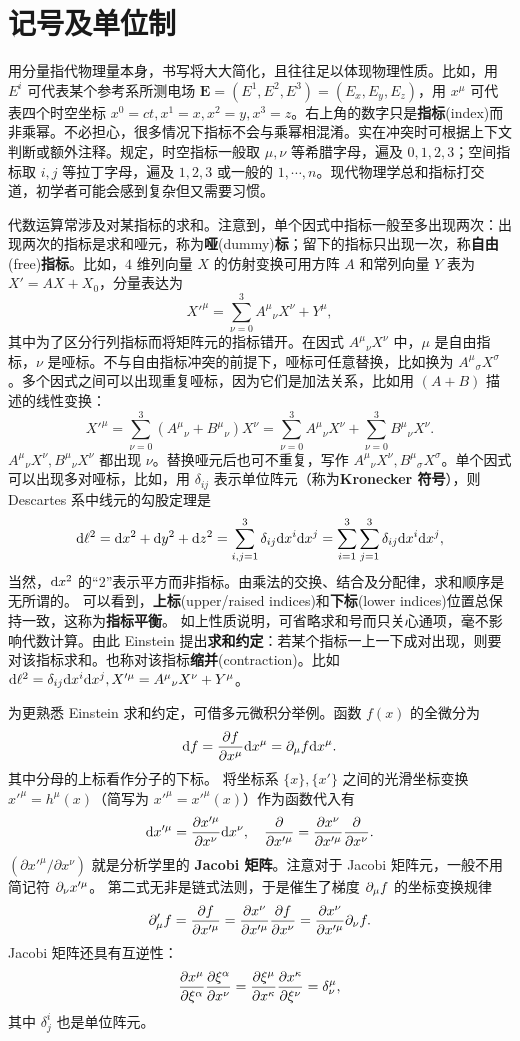 \chapter*{记号及单位制}



用分量指代物理量本身，书写将大大简化，且往往足以体现物理性质。比如，用 $E^i$ 可代表某个参考系所测电场 $\bm E=(E^1,E^2,E^3)=(E_x,E_y,E_z)$，用 $x^\mu$ 可代表四个时空坐标 $x^0=ct,x^1=x,x^2=y,x^3=z$。右上角的数字只是\textbf{指标}(index)而非乘幂。不必担心，很多情况下指标不会与乘幂相混淆。实在冲突时可根据上下文判断或额外注释。规定，时空指标一般取 $\mu,\nu$ 等希腊字母，遍及 $0,1,2,3$；空间指标取 $i,j$ 等拉丁字母，遍及 $1,2,3$ 或一般的 $1,\cdots,n$。现代物理学总和指标打交道，初学者可能会感到复杂但又需要习惯。

代数运算常涉及对某指标的求和。注意到，单个因式中指标一般至多出现两次：出现两次的指标是求和哑元，称为\textbf{哑}(dummy)\textbf{标}；留下的指标只出现一次，称\textbf{自由}(free)\textbf{指标}。比如，$4$ 维列向量 $X$ 的仿射变换可用方阵 $A$ 和常列向量 $Y$ 表为 $X'=AX+X_0$，分量表达为
\[X'^\mu=\sum_{\nu=0}^3 A^{\mu}{}_{\nu}X^\nu+ Y^\mu,\]
其中为了区分行列指标而将矩阵元的指标错开。在因式 $A^{\mu}{}_{\nu}X^\nu$ 中，$\mu$ 是自由指标，$\nu$ 是哑标。不与自由指标冲突的前提下，哑标可任意替换，比如换为 $A^{\mu}{}_{\sigma}X^\sigma$。多个因式之间可以出现重复哑标，因为它们是加法关系，比如用 $(A+B)$ 描述的线性变换：
\[X'^\mu=\sum_{\nu=0}^3 (A^{\mu}{}_{\nu}+B^{\mu}{}_{\nu})X^\nu=\sum_{\nu=0}^3 A^{\mu}{}_{\nu}X^\nu+\sum_{\nu=0}^3 B^{\mu}{}_{\nu}X^\nu.\]
$A^{\mu}{}_{\nu}X^\nu,B^{\mu}{}_{\nu}X^\nu$ 都出现 $\nu$。替换哑元后也可不重复，写作 $A^{\mu}{}_{\nu}X^\nu,B^{\mu}{}_{\sigma}X^\sigma$。单个因式可以出现多对哑标，比如，用 $\delta_{ij}$ 表示单位阵元（称为\textbf{Kronecker 符号}），则 Descartes 系中线元的勾股定理是
\[\dd\ell^2=\dd x^2+\dd y^2+\dd z^2=\sum_{i,j=1}^3\delta_{ij}\dd x^i\dd x^j=\sum_{i=1}^3\sum_{j=1}^3\delta_{ij}\dd x^i\dd x^j,\]
当然，$\dd x^2$ 的“2”表示平方而非指标。由乘法的交换、结合及分配律，求和顺序是无所谓的。
可以看到，\textbf{上标}(upper/raised indices)和\textbf{下标}(lower indices)位置总保持一致，这称为\textbf{指标平衡}。
如上性质说明，可省略求和号而只关心通项，毫不影响代数计算。由此 Einstein 提出\textbf{求和约定}：若某个指标一上一下成对出现，则要对该指标求和。也称对该指标\textbf{缩并}(contraction)。比如 $\dd\ell^2=\delta_{ij}\dd x^i\dd x^j,X'^\mu=A^{\mu}{}_{\nu}X^\nu+ Y^\mu$。

为更熟悉 Einstein 求和约定，可借多元微积分举例。函数 $f(x)$ 的全微分为
\[
    \dd f=\pdv{f}{x^\mu}\dd x^\mu=\partial_\mu f\dd x^\mu.
\]
其中分母的上标看作分子的下标。
将坐标系 $\{x\},\{x'\}$ 之间的光滑坐标变换 $x'^\mu=h^\mu(x)$（简写为 $x'^\mu=x'^\mu(x)$）作为函数代入有
\[
    \dd x'^\mu=\pdv{x'^\mu}{x^\nu}\dd x^\nu,\quad \pdv{x'^\mu} =\pdv{x^\nu}{x'^\mu} \pdv{x^\nu}. 
\]
$({\partial x'^\mu}/{\partial x^\nu})$ 就是分析学里的 \textbf{Jacobi 矩阵}。注意对于 Jacobi 矩阵元，一般不用简记符 $\partial_\nu x'^\mu$。
第二式无非是链式法则，于是催生了梯度 $\partial_\mu f$ 的坐标变换规律
\[
    \partial'_\mu f=\pdv{f}{x'^\mu}=\pdv{x^\nu}{x'^\mu}\pdv{f}{x^\nu}=\pdv{x^\nu}{x'^\mu}\partial_\nu f.
\]
Jacobi 矩阵还具有互逆性：
\[\pdv{x^\mu}{\xi^\alpha}\pdv{\xi^\alpha}{x^\nu}=\pdv{\xi^\mu}{x^\kappa} \pdv{x^\kappa}{\xi^\nu}=\delta^\mu_\nu,\]
其中 $\delta^i_j$ 也是单位阵元。

